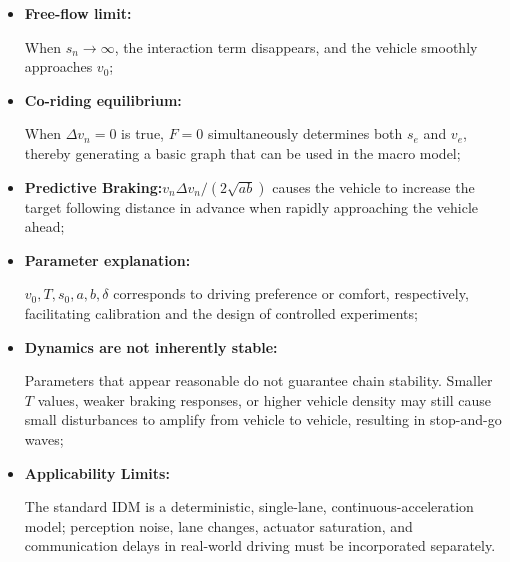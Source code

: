 \documentclass[11pt,a4paper,openany]{book}
\numberwithin{equation}{chapter}
\numberwithin{figure}{chapter}
\numberwithin{table}{chapter}
\begin{document}
\begin{itemize}[leftmargin=1.5em,itemsep=3pt]
\item \textbf{Free-flow limit:}




When $s_n\to\infty$, the interaction term disappears, and the vehicle smoothly approaches $v_0$;







\item \textbf{Co-riding equilibrium:}




When $\Delta v_n=0$ is true, $F=0$ simultaneously determines both $s_e$ and $v_e$, thereby generating a basic graph that can be used in the macro model;







\item \textbf{Predictive Braking:}$v_n\Delta v_n/(2\sqrt{ab})$ causes the vehicle to increase the target following distance in advance when rapidly approaching the vehicle ahead;







\item \textbf{Parameter explanation:}




$v_0,T,s_0,a,b,\delta$ corresponds to driving preference or comfort, respectively, facilitating calibration and the design of controlled experiments;







\item \textbf{Dynamics are not inherently stable:}




Parameters that appear reasonable do not guarantee chain stability. Smaller $T$ values, weaker braking responses, or higher vehicle density may still cause small disturbances to amplify from vehicle to vehicle, resulting in stop-and-go waves;







\item \textbf{Applicability Limits:}




The standard IDM is a deterministic, single-lane, continuous-acceleration model; perception noise, lane changes, actuator saturation, and communication delays in real-world driving must be incorporated separately.







\end{itemize}
\end{document}
